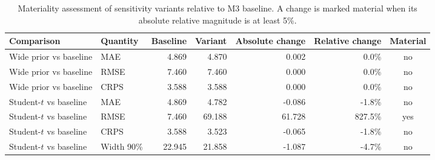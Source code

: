 \begin{table}[H]
\centering
\caption{{Materiality assessment of sensitivity variants relative to M3 baseline. A change is marked material when its absolute relative magnitude is at least 5\%.}\label{tab:s4-assessment}}
\scriptsize
\begin{tabularx}{\textwidth}{l l r r r r c}
\toprule
Comparison & Quantity & Baseline & Variant & Absolute change & Relative change & Material\\
\midrule
Wide prior vs baseline & MAE & 4.869 & 4.870 & 0.002 & 0.0\% & no\\
Wide prior vs baseline & RMSE & 7.460 & 7.460 & 0.000 & 0.0\% & no\\
Wide prior vs baseline & CRPS & 3.588 & 3.588 & 0.000 & 0.0\% & no\\
Student-$t$ vs baseline & MAE & 4.869 & 4.782 & -0.086 & -1.8\% & no\\
Student-$t$ vs baseline & RMSE & 7.460 & 69.188 & 61.728 & 827.5\% & yes\\
Student-$t$ vs baseline & CRPS & 3.588 & 3.523 & -0.065 & -1.8\% & no\\
Student-$t$ vs baseline & Width 90\% & 22.945 & 21.858 & -1.087 & -4.7\% & no\\
\bottomrule
\end{tabularx}
\end{table}
